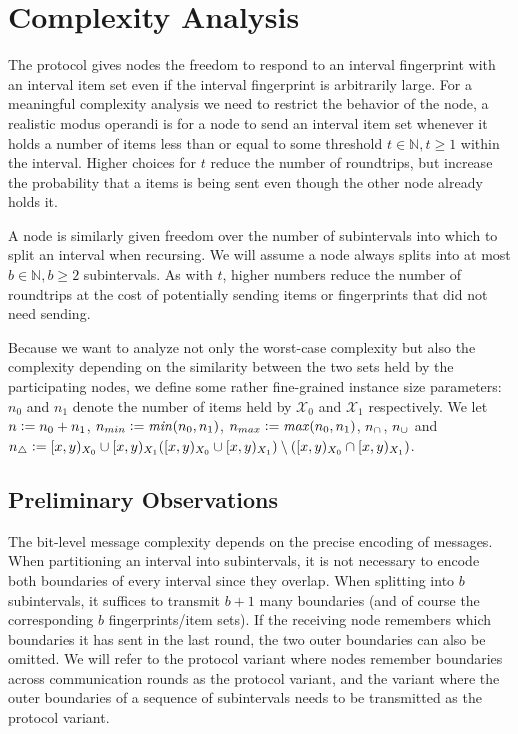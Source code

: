 \section{Complexity Analysis}
\label{set-reconciliation-complexity}

The protocol gives nodes the freedom to respond to an interval fingerprint with an interval item set even if the interval fingerprint is arbitrarily large. For a meaningful complexity analysis we need to restrict the behavior of the node, a realistic modus operandi is for a node to send an interval item set whenever it holds a number of items less than or equal to some threshold $t \in \mathbb{N}, t \geq 1$ within the interval. Higher choices for $t$ reduce the number of roundtrips, but increase the probability that a items is being sent even though the other node already holds it.

A node is similarly given freedom over the number of subintervals into which to split an interval when recursing. We will assume a node always splits into at most $b \in \mathbb{N}, b \geq 2$ subintervals. As with $t$, higher numbers reduce the number of roundtrips at the cost of potentially sending items or fingerprints that did not need sending.

Because we want to analyze not only the worst-case complexity but also the complexity depending on the similarity between the two sets held by the participating nodes, we define some rather fine-grained instance size parameters: $n_0$ and $n_1$ denote the number of items held by $\mathcal{X}_0$ and $\mathcal{X}_1$ respectively. We let $n \vcentcolon= n_0 + n_1$, $n_{min} \vcentcolon= \mathit{min}(n_0, n_1)$, $n_{max} \vcentcolon= \mathit{max}(n_0, n_1)$, $n_{\cap} \def \abs{\interval{x}{y}{X_0} \cap \interval{x}{y}{X_1}}$, $n_{\cup} \def \abs{\interval{x}{y}{X_0} \cup \interval{x}{y}{X_1}}$ and $n_{\triangle} \defeq \abs{(\interval{x}{y}{X_0} \cup \interval{x}{y}{X_1}) \setminus (\interval{x}{y}{X_0} \cap \interval{x}{y}{X_1})}$.

\subsection{Preliminary Observations}

The bit-level message complexity depends on the precise encoding of messages. When partitioning an interval into subintervals, it is not necessary to encode both boundaries of every interval since they overlap. When splitting into $b$ subintervals, it suffices to transmit $b + 1$ many boundaries (and of course the corresponding $b$ fingerprints/item sets). If the receiving node remembers which boundaries it has sent in the last round, the two outer boundaries can also be omitted. We will refer to the protocol variant where nodes remember boundaries across communication rounds as the  protocol variant, and the variant where the outer boundaries of a sequence of subintervals needs to be transmitted as the  protocol variant.

